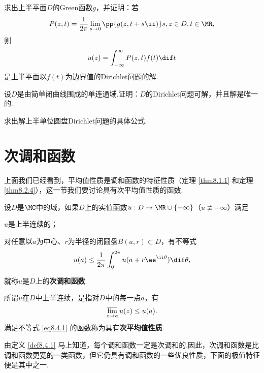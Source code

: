 \begin{xiti}
\item 求出上半平面$D$的Green函数$g$，并证明：若
\[P(z,t)=\frac1{2\pi}\lim_{s\to0}\pp{g(z,t+s\ii)}s,z\in D,t\in\MR,\]
则
\[u(z)=\int_{-\infty}^\infty P(z,t)f(t)\dif t\]
是上半平面以$f(t)$为边界值的Dirichlet问题的解.
\item 设$D$是由简单闭曲线围成的单连通域.证明：$D$的Dirichlet问题可解，并且解是唯一的.
\item 求出解上半单位圆盘Dirichlet问题的具体公式.
\end{xiti}

\section{次调和函数\label{sec8.4}}
上面我们已经看到，平均值性质是调和函数的特征性质（定理 \ref{thm8.1.1} 和定理 \ref{thm8.2.4}），这一节我们要讨论具有次平均值性质的函数.
\begin{definition}\label{def8.4.1}
设$D$是$\MC$中的域，如果$D$上的实值函数$u:D\to\MR\cup\{-\infty\}$（$u\not\equiv-\infty$）满足
\begin{eenum}
  \item $u$是上半连续的；
  \item 对任意以$a$为中心、$r$为半径的闭圆盘$\bar{B(a,r)}\subset D$，有不等式
  \begin{equation}\label{eq8.4.1}
    u(a)\le\frac1{2\pi}\int_0^{2\pi}u(a+r\ee^{\ii\theta})\dif \theta,
  \end{equation}
\end{eenum}
就称$u$是$D$上的\textbf{次调和函数}.
\end{definition}

所谓$u$在$D$中上半连续，是指对$D$中的每一点$a$，有
\[\varlimsup_{z\to a}u(z)\le u(a).\]
满足不等式 \eqref{eq8.4.1} 的函数称为具有\textbf{次平均值性质}.

由定义 \ref{def8.4.1} 马上知道，每个调和函数一定是次调和的.因此，次调和函数是比调和函数更宽的一类函数，但它仍具有调和函数的一些优良性质，下面的极值特征便是其中之一.

